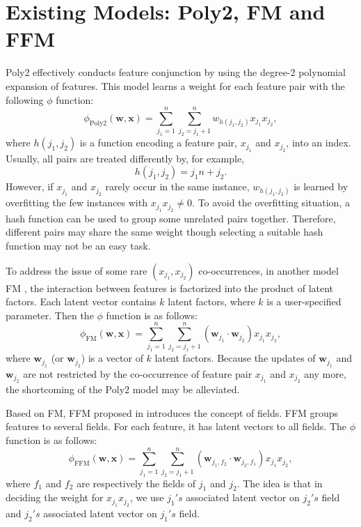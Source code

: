 \section{Existing Models: Poly2, FM and FFM}
\label{sec:FM}

Poly2 \cite{Chang:2010:TTL:1756006.1859899} effectively conducts feature conjunction by using the degree-2 polynomial expansion of features. This model learns a weight for each feature pair with the following $\phi$ function:
\begin{equation}
\label{poly2}
\phi_{\text{Poly2}}(\boldsymbol{w},\boldsymbol{x})=\sum_{j_1=1}^{n}\sum_{j_2=j_1+1}^{n} w_{h(j_1,j_2)}x_{j_1}x_{j_2},
\end{equation}
where $h(j_1,j_2)$ is a function encoding a feature pair, $x_{j_1}$ and $x_{j_2}$, into an index. Usually, all pairs are treated differently by, for example, \\
\begin{equation}
\label{hfunction}
h({j_1},{j_2})={j_1}n+{j_2}.
\end{equation}
However, if $x_{j_1}$ and $x_{j_2}$ rarely occur in the same instance, $w_{h({j_1},{j_2})}$ is learned by overfitting the few instances with $x_{j_1}x_{j_2}\neq0$. To avoid the overfitting situation, a hash function can be used to group some unrelated pairs together. Therefore, different pairs may share the same weight though selecting a suitable hash function may not be an easy task.

To address the issue of some rare $(x_{j_1}, x_{j_2})$ co-occurrences, in another model FM \cite{5694074}, the interaction between features is factorized into the product of latent factors. Each latent vector contains $k$ latent factors, where $k$ is a user-specified parameter. Then the $\phi$ function is as follows:
\begin{equation}
\label{fm}
\phi_{\text{FM}}(\boldsymbol{w},\boldsymbol{x}) = \sum_{j_1=1}^{n}\sum_{j_2=j_1+1}^{n} (\boldsymbol{w}_{j_1}\cdot\boldsymbol{w}_{j_2})x_{j_1}x_{j_2},
\end{equation}
where $\boldsymbol{w}_{j_1}$ (or $\boldsymbol{w}_{j_2}$) is a vector of $k$ latent factors. Because the updates of $\boldsymbol{w}_{j_1}$ and $\boldsymbol{w}_{j_2}$ are not restricted by the co-occurrence of feature pair $x_{j_1}$ and $x_{j_2}$ any more, the shortcoming of the Poly2 model may be alleviated.

Based on FM, FFM proposed in \cite{Juan:2016:FFM:2959100.2959134} introduces the concept of fields. FFM groups features to several fields.  For each feature, it has latent vectors to all fields. The $\phi$ function is as follows:
\begin{equation}
\label{ffm}
\phi_{\text{FFM}}(\boldsymbol{w},\boldsymbol{x}) = \sum_{j_1=1}^{n}\sum_{j_2=j_1+1}^n (\boldsymbol{w}_{j_1,f_2}\cdot\boldsymbol{w}_{j_2,f_1})x_{j_1}x_{j_2},
\end{equation}
where $f_1$ and $f_2$ are respectively the fields of $j_1$ and $j_2$. The idea is that in deciding the weight for $x_{j_1}x_{j_2}$, we use ${j_1's}$ associated latent vector on ${j_2's}$ field and ${j_2's}$ associated latent vector on ${j_1's}$ field.

